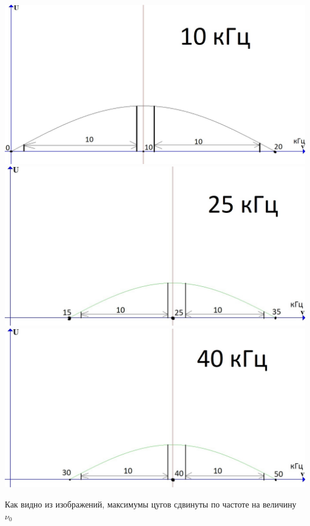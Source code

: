 \documentclass[a4paper,12pt]{article} %
\begin{document}
\begin{flushleft}

\includegraphics[scale=0.55]{10} \\
\includegraphics[scale=0.55]{25} \\
\includegraphics[scale=0.55]{40} \\

\end{flushleft}
Как видно из изображений, максимумы цугов сдвинуты по частоте на величину  $\nu_0$\\
\end{document}
